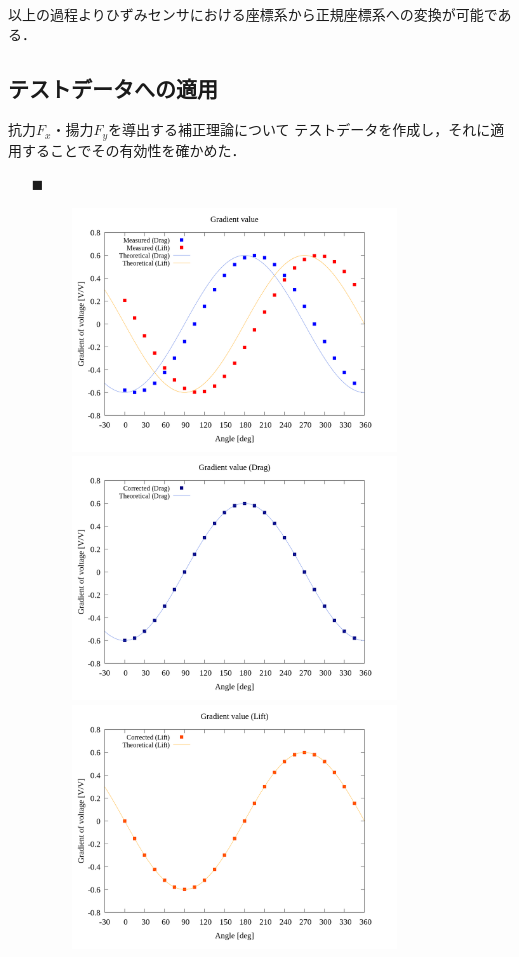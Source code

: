 \documentclass[twocolumn,a4j]{jsarticle}
\begin{document}
以上の過程よりひずみセンサにおける座標系から正規座標系への変換が可能である．

\newpage

\subsection{テストデータへの適用}
抗力$F_x$・揚力$F_y$を導出する補正理論について
テストデータを作成し，それに適用することでその有効性を確かめた．

\begin{itemize}
    \item [$\blacksquare$] \\
          \begin{figure}[htbp]
              \footnotesize
              \begin{center}
                  \includegraphics[width=86mm]{../graphes/simulation_150_200/20/20_adjust-value.png}
                  \caption{}
                  \includegraphics[width=86mm]{../graphes/simulation_150_200/21/21-2_corrected_drag.png}
                  \caption{}
                  \includegraphics[width=86mm]{../graphes/simulation_150_200/21/21-2_corrected_lift.png}

\end{center}
\end{figure}
\end{itemize}
\end{document}
